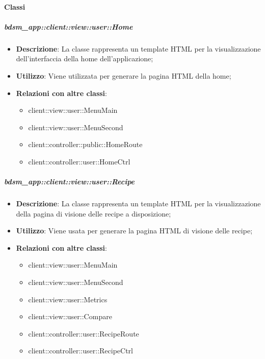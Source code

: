	\paragraph{Classi} %
		\subparagraph{bdsm\_app::client::view::user::Home} %
		\label{subp:bdsm_app_client_view_user_home}
			\begin{itemize}
				\item \textbf{Descrizione}: La classe rappresenta un template HTML per la visualizzazione dell'interfaccia della home dell'applicazione;
				\item \textbf{Utilizzo}: Viene utilizzata per generare la pagina HTML della home;
				\item \textbf{Relazioni con altre classi}:
					\begin{itemize}
						\item client::view::user::MenuMain
						\item client::view::user::MenuSecond
						\item client::controller::public::HomeRoute
						\item client::controller::user::HomeCtrl
					\end{itemize}
			\end{itemize}

		\subparagraph{bdsm\_app::client::view::user::Recipe} %
		\label{subp:bdsm_app_client_view_user_recipe}
			\begin{itemize}
				\item \textbf{Descrizione}: La classe rappresenta un template HTML per la visualizzazione della pagina di visione delle recipe a disposizione;
				\item \textbf{Utilizzo}: Viene usata per generare la pagina HTML di visione delle recipe;
				\item \textbf{Relazioni con altre classi}:
					\begin{itemize}
						\item client::view::user::MenuMain
						\item client::view::user::MenuSecond
						\item client::view::user::Metrics
						\item client::view::user::Compare
						\item client::controller::user::RecipeRoute
						\item client::controller::user::RecipeCtrl
					\end{itemize}
			\end{itemize}

